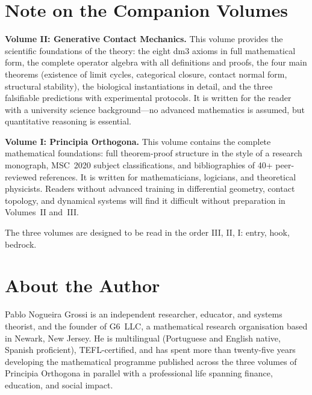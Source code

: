 \documentclass[12pt, oneside]{book}
\theoremstyle{plain}
\theoremstyle{definition}
\theoremstyle{remark}
\begin{document}
\chapter*{Note on the Companion Volumes}

\textbf{Volume II: Generative Contact Mechanics.}
This volume provides the scientific foundations of the theory:
the eight dm3 axioms in full mathematical form, the complete
operator algebra with all definitions and proofs, the four
main theorems (existence of limit cycles, categorical closure,
contact normal form, structural stability), the biological
instantiations in detail, and the three falsifiable predictions
with experimental protocols. It is written for the reader
with a university science background---no advanced mathematics
is assumed, but quantitative reasoning is essential.

\textbf{Volume I: Principia Orthogona.}
This volume contains the complete mathematical foundations:
full theorem-proof structure in the style of a research
monograph, MSC~2020 subject classifications, and bibliographies
of 40+ peer-reviewed references. It is written for mathematicians,
logicians, and theoretical physicists. Readers without advanced
training in differential geometry, contact topology, and dynamical
systems will find it difficult without preparation in Volumes~II
and~III.

The three volumes are designed to be read in the order III,
II, I: entry, hook, bedrock.

\backmatter

\chapter*{About the Author}

Pablo Nogueira Grossi is an independent researcher, educator,
and systems theorist, and the founder of G6~LLC, a mathematical
research organisation based in Newark, New Jersey. He is
multilingual (Portuguese and English native, Spanish proficient),
TEFL-certified, and has spent more than twenty-five years
developing the mathematical programme published across the
three volumes of Principia Orthogona in parallel with a
professional life spanning finance, education, and social impact.
\end{document}

